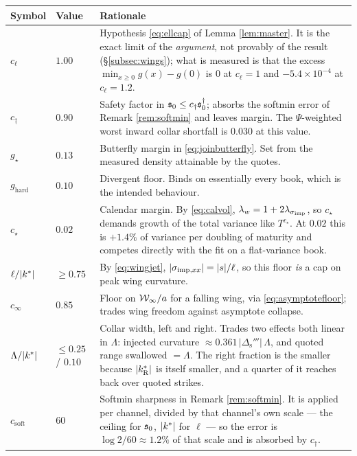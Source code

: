 \begin{table}[H]
\centering
\small
\begin{tabular}{llp{12.4cm}}
\hline
Symbol & Value & Rationale\\
\hline
$c_{\ell}$ & $1.00$ & Hypothesis \eqref{eq:ellcap} of Lemma \ref{lem:master}. It is the exact limit
  of the \emph{argument}, not provably of the result (\S\ref{subsec:wings}); what is measured is that
  the excess $\min_{x\ge0}g(x)-g(0)$ is $0$ at $c_{\ell}=1$ and $-5.4\times10^{-4}$ at
  $c_{\ell}=1.2$.\\
$c_{\dagger}$ & $0.90$ & Safety factor in $\mathfrak{s}_{0}\le c_{\dagger}\mathfrak{s}_{0}^{\dagger}$; absorbs
  the softmin error of Remark \ref{rem:softmin} and leaves margin. The $\Psi$-weighted worst inward
  collar shortfall is $0.030$ at this value.\\
$g_{\star}$ & $0.13$ & Butterfly margin in \eqref{eq:joinbutterfly}. Set from the measured density
  attainable by the quotes.\\
$g_{\mathrm{hard}}$ & $0.10$ & Divergent floor. Binds on essentially every book, which is the
  intended behaviour.\\
$c_{\star}$ & $0.02$ & Calendar margin. By \eqref{eq:calvol}, $\lambda_{w}=1+2\lambda_{\sigma_{\mathrm{imp}}}$, so
  $c_{\star}$ demands growth of the total variance like $T^{c_{\star}}$. At $0.02$ this is $+1.4\%$
  of variance per doubling of maturity and competes directly with the fit on a flat-variance book.\\
$\ell/|k^{*}|$ & $\ge0.75$ & By \eqref{eq:wingjet}, $|\sigma_{\mathrm{imp},xx}|=|s|/\ell$, so this floor
  \emph{is} a cap on peak wing curvature.\\
$c_{\infty}$ & $0.85$ & Floor on $\mathcal{W}_{\infty}/a$ for a falling wing, via \eqref{eq:asymptotefloor}; trades
  wing freedom against asymptote collapse.\\
$\Lambda/|k^{*}|$ & $\le0.25$ / $0.10$ & Collar width, left and right. Trades two effects both
  linear in $\Lambda$: injected curvature $\approx0.361\,|\Delta_{\mathrm{s}}'''|\,\Lambda$, and
  quoted range swallowed $=\Lambda$. The right fraction is the smaller because $|k^{*}_{\mathrm{R}}|$
  is itself smaller, and a quarter of it reaches back over quoted strikes.\\
$c_{\mathrm{soft}}$ & $60$ & Softmin sharpness in Remark \ref{rem:softmin}. It is applied per
  channel, divided by that channel's own scale --- the ceiling for $\mathfrak{s}_{0}$, $|k^{*}|$ for
  $\ell$ --- so the error is $\log2/60\approx1.2\%$ of that scale and is absorbed by $c_{\dagger}$.

\end{tabular}
\end{table}

